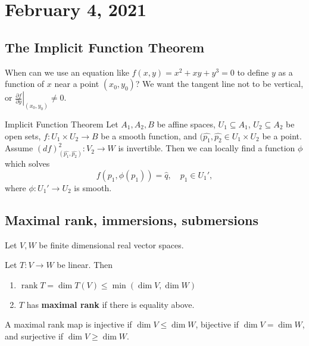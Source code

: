 \section{February 4, 2021}
\subsection{The Implicit Function Theorem}
When can we use an equation  like $f(x,y)= x^2+xy+y^3=0$ to define $y$ as a function of $x$ near a point $(x_0,y_0)$? We want the tangent line not to be vertical, or $\left. \frac{\partial f}{\partial y} \right| _{(x_0,y_0)}\neq 0$.
    \begin{namedthm}{Implicit Function Theorem}
        Let $A_1,A_2,B$ be affine spaces, $U_1 \subseteq A_1$, $U_2\subseteq A_2$ be open sets, $f \colon U_1\times U_2 \to B$ be a smooth function, and $(\hat{p_1}, \hat{p_2}\in  U_1 \times U_2$ be a point. Assume $(df)^2 _{(\hat{p_1}, \hat{p_2})} \colon V_2 \to W$ is invertible. Then we can locally find a function $\phi$ which solves \[
            f(p_1, \phi(p_1))=\hat{q}, \quad p_1 \in U_1',
        \] where $\phi \colon U_1' \to U_2$ is smooth.
\end{namedthm}
\subsection{Maximal rank, immersions, submersions}
Let $V, W$ be finite dimensional real vector spaces. 
\begin{definition}[]
    Let $T \colon V \to W$ be linear. Then
    \begin{enumerate}[label=(\roman*)]
        \item $\operatorname{rank}T= \operatorname{dim}T(V) \leq \min (\dim V, \dim W)$
        \item $T$ has \textbf{maximal rank} if there is equality above. 
    \end{enumerate}
    A maximal rank map is injective if $\dim V \leq \dim W$, bijective if $\dim V=\dim W$, and surjective if $\dim V \geq \dim W$.
\end{definition}

